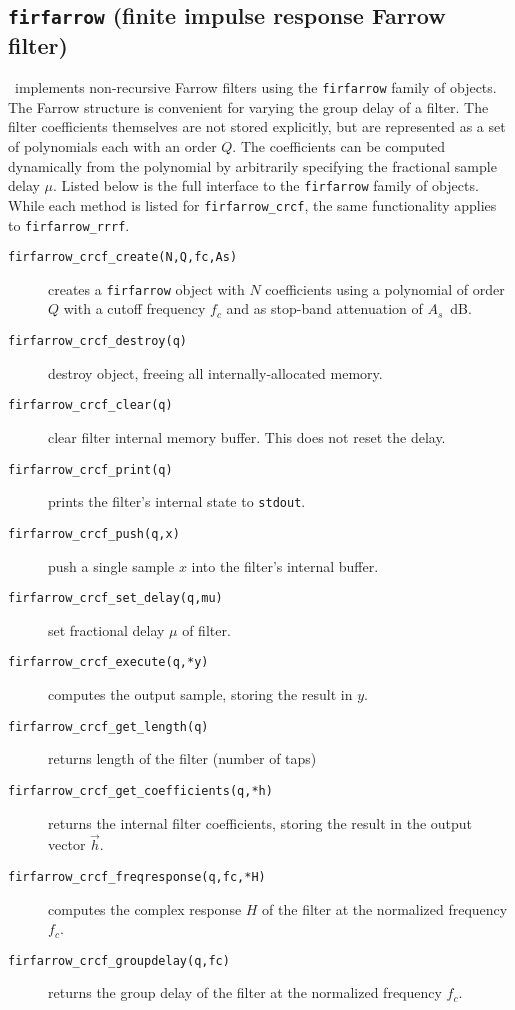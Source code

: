 \subsection{{\tt firfarrow} (finite impulse response Farrow filter)}
\label{module:filter:firfarrow}
\liquid\ implements non-recursive Farrow filters using the
{\tt firfarrow} family of objects.
The Farrow structure is convenient for varying the group delay of a
filter.
The filter coefficients themselves are not stored explicitly, but are
represented as a set of polynomials each with an order $Q$.
The coefficients can be computed dynamically from the polynomial by
arbitrarily specifying the fractional sample delay $\mu$.
%
Listed below is the full interface to the {\tt firfarrow} family of
objects.
While each method is listed for {\tt firfarrow\_crcf}, the same
functionality applies to {\tt firfarrow\_rrrf}.
%
\begin{description}
\item[{\tt firfarrow\_crcf\_create(N,Q,fc,As)}]
    creates a {\tt firfarrow} object with $N$ coefficients using a
    polynomial of order $Q$ with a cutoff frequency $f_c$ and as
    stop-band attenuation of $A_s$~dB.
\item[{\tt firfarrow\_crcf\_destroy(q)}]
    destroy object, freeing all internally-allocated memory.
\item[{\tt firfarrow\_crcf\_clear(q)}]
    clear filter internal memory buffer.
    This does not reset the delay.
\item[{\tt firfarrow\_crcf\_print(q)}]
    prints the filter's internal state to {\tt stdout}.
\item[{\tt firfarrow\_crcf\_push(q,x)}]
    push a single sample $x$ into the filter's internal buffer.
\item[{\tt firfarrow\_crcf\_set\_delay(q,mu)}]
    set fractional delay $\mu$ of filter.
\item[{\tt firfarrow\_crcf\_execute(q,*y)}]
    computes the output sample, storing the result in $y$.
\item[{\tt firfarrow\_crcf\_get\_length(q)}]
    returns length of the filter (number of taps)
\item[{\tt firfarrow\_crcf\_get\_coefficients(q,*h)}]
    returns the internal filter coefficients, storing the result in the
    output vector $\vec{h}$.
\item[{\tt firfarrow\_crcf\_freqresponse(q,fc,*H)}]
    computes the complex response $H$ of the filter at the normalized
    frequency $f_c$.
\item[{\tt firfarrow\_crcf\_groupdelay(q,fc)}]
    returns the group delay of the filter at the normalized
    frequency $f_c$.
\end{description}
